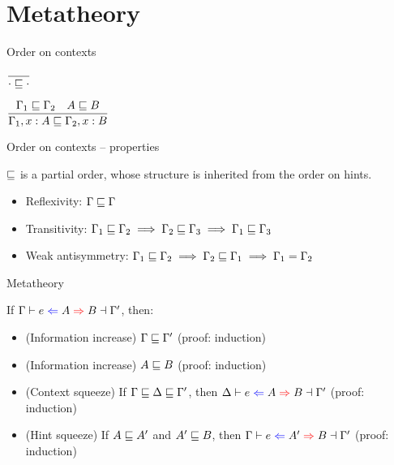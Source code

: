 \documentclass{beamer}
\begin{document}
\section{Metatheory}

\begin{frame}{Order on contexts}

\begin{center}
  $\displaystyle \frac{}{\cdot \sqsubseteq \cdot} \textsc{\footnotesize{}}$

  \vspace{2em}

  $\infrule{\ctxorder{\Gamma_1}{\Gamma_2} \quad \hintorder{A}{B}}{\ctxorder{\extend{\Gamma_1}{x}{A}}{\extend{\Gamma_2}{x}{B}}}$
\end{center}

\end{frame}

\begin{frame}{Order on contexts -- properties}

$\sqsubseteq$ is a partial order, whose structure is inherited from the order on hints.

\begin{itemize}
  \item Reflexivity: $\Gamma \sqsubseteq \Gamma$
  \item Transitivity: $\Gamma_1 \sqsubseteq \Gamma_2 \implies \Gamma_2 \sqsubseteq \Gamma_3 \implies \Gamma_1 \sqsubseteq \Gamma_3$
  \item Weak antisymmetry: $\Gamma_1 \sqsubseteq \Gamma_2 \implies \Gamma_2 \sqsubseteq \Gamma_1 \implies \Gamma_1 = \Gamma_2$
\end{itemize}

\end{frame}

\begin{frame}{Metatheory}

If $\outctx[\Gamma]{e}{A}{B}[\Gamma']$, then:

\begin{itemize}
  \item (Information increase) $\Gamma \sqsubseteq \Gamma'$ (proof: induction)
  \item (Information increase) $A \sqsubseteq B$ (proof: induction)
  \item (Context squeeze) If $\Gamma \sqsubseteq \Delta \sqsubseteq \Gamma'$, then $\outctx[\Delta]{e}{A}{B}[\Gamma']$ (proof: induction)
  \item (Hint squeeze) If $A \sqsubseteq A'$ and $A' \sqsubseteq B$, then $\outctx[\Gamma]{e}{A'}{B}[\Gamma']$ (proof: induction)
\end{itemize}

\end{frame}
\end{document}
